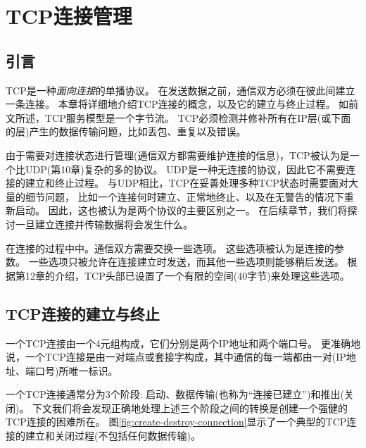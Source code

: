 \documentclass{../main.tex}{subfiles}
\begin{document}

\chapter{TCP连接管理}
\section{引言}
TCP是一种\emph{面向连接}的单播协议。
在发送数据之前，通信双方必须在彼此间建立一条连接。
本章将详细地介绍TCP连接的概念，以及它的建立与终止过程。
如前文所述，TCP服务模型是一个字节流。
TCP必须检测并修补所有在IP层(或下面的层)产生的数据传输问题，比如丢包、重复以及错误。

由于需要对连接状态进行管理(通信双方都需要维护连接的信息)，TCP被认为是一个比UDP(第10章)复杂的多的协议。
UDP是一种无连接的协议，因此它不需要连接的建立和终止过程。
与UDP相比，TCP在妥善处理多种TCP状态时需要面对大量的细节问题，
比如一个连接何时建立、正常地终止、以及在无警告的情况下重新启动。
因此，这也被认为是两个协议的主要区别之一。
在后续章节，我们将探讨一旦建立连接并传输数据将会发生什么。

在连接的过程中中。通信双方需要交换一些选项。
这些选项被认为是连接的参数。
一些选项只被允许在连接建立时发送，而其他一些选项则能够稍后发送。
根据第12章的介绍，TCP头部已设置了一个有限的空间(40字节)来处理这些选项。

\section{TCP连接的建立与终止}
一个TCP连接由一个4元组构成，它们分别是两个IP地址和两个端口号。
更准确地说，一个TCP连接是由一对端点或套接字构成，其中通信的每一端都由一对(IP地址、端口号)所唯一标识。

一个TCP连接通常分为3个阶段: 启动、数据传输(也称为``连接已建立'')和推出(关闭)。
下文我们将会发现正确地处理上述三个阶段之间的转换是创建一个强健的TCP连接的困难所在。
图\ref{fig:create-destroy-connection}显示了一个典型的TCP连接的建立和关闭过程(不包括任何数据传输)。
\end{document}
